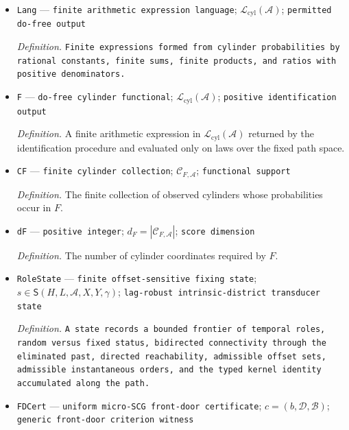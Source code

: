 \documentclass{article}
\begin{document}
\begin{itemize}
  \par\smallskip\noindent\emph{Definition.} The probability under \(P_M\) of a finite cylinder in \(\Omega_{\mathcal A}\).
  \item \texttt{Lang} --- \texttt{finite arithmetic expression language}; \(\mathcal L_{\mathrm{cyl}}(\mathcal A)\); \texttt{permitted do-\allowbreak{}free output}
  \par\smallskip\noindent\emph{Definition.} \texttt{Finite expressions formed from cylinder probabilities by rational constants,\allowbreak{} finite sums,\allowbreak{} finite products,\allowbreak{} and ratios with positive denominators.}
  \item \texttt{F} --- \texttt{do-\allowbreak{}free cylinder functional}; \(\mathcal L_{\mathrm{cyl}}(\mathcal A)\); \texttt{positive identification output}
  \par\smallskip\noindent\emph{Definition.} A finite arithmetic expression in \(\mathcal L_{\mathrm{cyl}}(\mathcal A)\) returned by the identification procedure and evaluated only on laws over the fixed path space.
  \item \texttt{CF} --- \texttt{finite cylinder collection}; \(\mathcal C_{F,\mathcal A}\); \texttt{functional support}
  \par\smallskip\noindent\emph{Definition.} The finite collection of observed cylinders whose probabilities occur in \(F\).
  \item \texttt{dF} --- \texttt{positive integer}; \(d_F=|\mathcal C_{F,\mathcal A}|\); \texttt{score dimension}
  \par\smallskip\noindent\emph{Definition.} The number of cylinder coordinates required by \(F\).
  \item \texttt{RoleState} --- \texttt{finite offset-\allowbreak{}sensitive fixing state}; \(s\in\mathsf S(H,L,\mathcal A,X,Y,\gamma)\); \texttt{lag-\allowbreak{}robust intrinsic-\allowbreak{}district transducer state}
  \par\smallskip\noindent\emph{Definition.} \texttt{A state records a bounded frontier of temporal roles,\allowbreak{} random versus fixed status,\allowbreak{} bidirected connectivity through the eliminated past,\allowbreak{} directed reachability,\allowbreak{} admissible offset sets,\allowbreak{} admissible instantaneous orders,\allowbreak{} and the typed kernel identity accumulated along the path.}
  \item \texttt{FDCert} --- \texttt{uniform micro-\allowbreak{}SCG front-\allowbreak{}door certificate}; \(c=(b,\mathcal D,\mathcal B)\); \texttt{generic front-\allowbreak{}door criterion witness}

\end{itemize}
\end{document}
